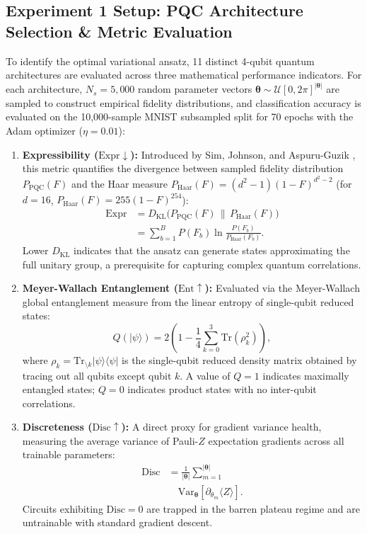 \documentclass[pdflatex,sn-mathphys-num]{sn-jnl}%
\theoremstyle{thmstyleone}%
\theoremstyle{thmstyletwo}%
\theoremstyle{thmstylethree}%
\begin{document}
\subsection{Experiment 1 Setup: PQC Architecture Selection \& Metric Evaluation}
To identify the optimal variational ansatz, 11 distinct 4-qubit quantum architectures are evaluated across three mathematical performance indicators. For each architecture, $N_s = 5{,}000$ random parameter vectors $\boldsymbol{\theta} \sim \mathcal{U}[0, 2\pi]^{|\boldsymbol{\theta}|}$ are sampled to construct empirical fidelity distributions, and classification accuracy is evaluated on the 10,000-sample MNIST subsampled split for 70 epochs with the Adam optimizer ($\eta = 0.01$):
\begin{enumerate}
    \item \textbf{Expressibility ($\mathrm{Expr} \downarrow$):} Introduced by Sim, Johnson, and Aspuru-Guzik \cite{sim2019expressibility}, this metric quantifies the divergence between sampled fidelity distribution $P_{\mathrm{PQC}}(F)$ and the Haar measure $P_{\mathrm{Haar}}(F) = (d^2-1)(1-F)^{d^2-2}$ (for $d=16$, $P_{\mathrm{Haar}}(F) = 255(1-F)^{254}$):
    \begin{align}
    \mathrm{Expr} &= D_{\mathrm{KL}}\big( P_{\mathrm{PQC}}(F) \,\|\, P_{\mathrm{Haar}}(F) \big) \nonumber \\
    &= \sum_{b=1}^{B} P(F_b) \ln \frac{P(F_b)}{P_{\mathrm{Haar}}(F_b)}.
    \label{eq:expressibility_metric}
    \end{align}
    Lower $D_{\mathrm{KL}}$ indicates that the ansatz can generate states approximating the full unitary group, a prerequisite for capturing complex quantum correlations.
    \item \textbf{Meyer-Wallach Entanglement ($\mathrm{Ent} \uparrow$):} Evaluated via the Meyer-Wallach global entanglement measure \cite{meyer2002global} from the linear entropy of single-qubit reduced states:
    \begin{equation}
    Q(|\psi\rangle) = 2 \left( 1 - \frac{1}{4} \sum_{k=0}^{3} \mathrm{Tr}(\rho_k^2) \right),
    \label{eq:meyer_wallach}
    \end{equation}
    where $\rho_k = \mathrm{Tr}_{\setminus k} |\psi\rangle\langle\psi|$ is the single-qubit reduced density matrix obtained by tracing out all qubits except qubit $k$. A value of $Q = 1$ indicates maximally entangled states; $Q = 0$ indicates product states with no inter-qubit correlations.
    \item \textbf{Discreteness ($\mathrm{Disc} \uparrow$):} A direct proxy for gradient variance health, measuring the average variance of Pauli-$Z$ expectation gradients across all trainable parameters:
    \begin{align}
    \mathrm{Disc} &= \frac{1}{|\boldsymbol{\theta}|} \sum_{m=1}^{|\boldsymbol{\theta}|} \nonumber \\
    &\quad \mathrm{Var}_{\boldsymbol{\theta}}[\partial_{\theta_m} \langle Z \rangle].
    \label{eq:discreteness_metric}
    \end{align}
    Circuits exhibiting $\mathrm{Disc} = 0$ are trapped in the barren plateau regime and are untrainable with standard gradient descent.
\end{enumerate}
\end{document}

